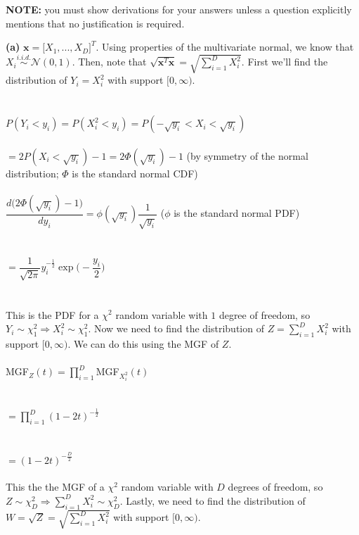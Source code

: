 \documentclass[submit]{harvardml}
\newcommand{\N}{\mathcal{N}}
\begin{document}
\noindent \textbf{NOTE:} you must show derivations for your answers unless a question explicitly mentions that no justification is required.



\textbf{(a)} $\mathbf{x}=\big[X_1,...,X_D\big]^T$. Using properties of the multivariate normal, we know that $X_i\stackrel{i.i.d.}{\sim}\N(0,1)$. Then, note that $\sqrt{\mathbf{x}^T\mathbf{x}}=\sqrt{\displaystyle\sum_{i=1}^{D}X_i^2}$. First we'll find the distribution of $Y_i=X_i^2$ with support $[0, \infty)$.\\\\\\
$P(Y_i<y_i)=P(X_i^2<y_i)=P(-\sqrt{y_i}<X_i<\sqrt{y_i})$\\\\
$=2P(X_i<\sqrt{y_i})-1=2\Phi(\sqrt{y_i})-1$ (by symmetry of the normal distribution; $\Phi$ is the standard normal CDF)\\\\
$\dfrac{d\big(2\Phi(\sqrt{y_i})-1\big)}{dy_i}=\phi(\sqrt{y_i})\dfrac{1}{\sqrt{y_i}}$ ($\phi$ is the standard normal PDF)\\\\\\
$=\dfrac{1}{\sqrt{2\pi}}y_i^{-\frac{1}{2}}\exp\bigg(-\dfrac{y_i}{2}\bigg)$\\\\\\
This is the PDF for a $\chi^2$ random variable with $1$ degree of freedom, so $Y_i\sim \chi^2_1\Rightarrow X_i^2\sim \chi^2_1$. Now we need to find the distribution of $Z=\displaystyle\sum_{i=1}^{D}X_i^2$ with support $[0,\infty)$. We can do this using the MGF of $Z$.\\\\
MGF$_Z(t)=\displaystyle\prod_{i=1}^{D}$MGF$_{X_i^2}(t)$\\\\\\
$=\displaystyle\prod_{i=1}^{D}(1-2t)^{-\frac{1}{2}}$\\\\\\
$=(1-2t)^{-\frac{D}{2}}$\\\\
This the the MGF of a $\chi^2$ random variable with $D$ degrees of freedom, so $Z\sim\chi^2_D\Rightarrow\displaystyle\sum_{i=1}^{D}X_i^2\sim\chi^2_D$. Lastly, we need to find the distribution of $W=\sqrt{Z}=\sqrt{\displaystyle\sum_{i=1}^{D}X_i^2}$ with support $[0,\infty)$.\\\\
\end{document}
